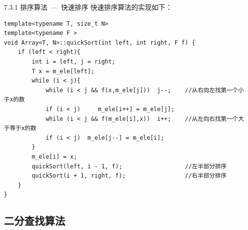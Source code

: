 
\begin{frame}[fragile]{7.3.1 排序算法\normalsize{~---~快速排序}}
\vspace{-2mm}
快速排序算法的实现如下：
\vspace{-1mm}
\begin{blueblock}{}
\vspace{-2mm}
\begin{lstlisting}[moreemph={Array,T,F}]
template<typename T, size_t N>
template<typename F >
void Array<T, N>::quickSort(int left, int right, F f) {
    if (left < right){
        int i = left, j = right;
        T x = m_ele[left];
        while (i < j){
            while (i < j && f(x,m_ele[j]))  j--;    //从右向左找第一个小于x的数
            if (i < j)     m_ele[i++] = m_ele[j];
            while (i < j && f(m_ele[i],x))  i++;    //从左向右找第一个大于等于x的数
            if (i < j)  m_ele[j--] = m_ele[i];
        }
        m_ele[i] = x;
        quickSort(left, i - 1, f);                  //左半部分排序
        quickSort(i + 1, right, f);                 //右半部分排序
    }
}
\end{lstlisting}
\end{blueblock}

\end{frame}
\subsection{二分查找算法}


